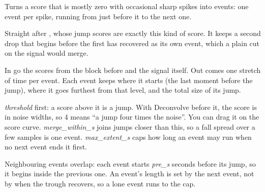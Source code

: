 Turns a score that is mostly zero with occasional sharp spikes into events: one event per
spike, running from just before it to the next one.

Straight after , whose jump scores are exactly this kind of
score. It keeps a second drop that begins before the first has recovered as its own event,
which a plain cut on the signal would merge.

In go the scores from the block before and the signal itself. Out comes one stretch of time
per event. Each event keeps where it starts (the last moment before the jump), where it goes
furthest from that level, and the total size of its jump.

\emph{threshold} first: a score above it is a jump. With Deconvolve before it, the score is in
noise widths, so 4 means ``a jump four times the noise''. You can drag it on the score curve.
\emph{merge\_within\_s} joins jumps closer than this, so a fall spread over a few samples is one
event. \emph{max\_extent\_s} caps how long an event may run when no next event ends it first.

Neighbouring events overlap: each event starts \emph{pre\_s} seconds before its jump, so it
begins inside the previous one. An event's length is set by the next event, not by when the
trough recovers, so a lone event runs to the cap.
